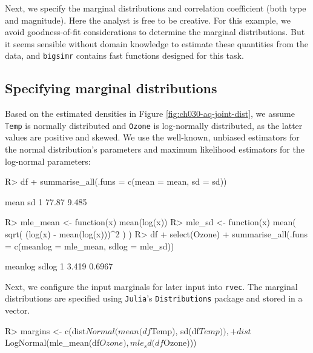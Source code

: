 \documentclass[
]{jss}
\begin{document}
Next, we specify the marginal distributions and correlation coefficient (both type and magnitude). Here the analyst is free to be creative. For this example, we avoid goodness-of-fit considerations to determine the marginal distributions. But it seems sensible without domain knowledge to estimate these quantities from the data, and \texttt{bigsimr} contains fast functions designed for this task.

\hypertarget{specifying-marginal-distributions}{%
\subsection{Specifying marginal distributions}\label{specifying-marginal-distributions}}

Based on the estimated densities in Figure \ref{fig:ch030-aq-joint-dist}, we assume \texttt{Temp} is normally distributed and \texttt{Ozone} is log-normally distributed, as the latter values are positive and skewed. We use the well-known, unbiased estimators for the normal distribution's parameters and maximum likelihood estimators for the log-normal parameters:

\begin{CodeChunk}
\begin{CodeInput}
R> df %
+   summarise_all(.funs = c(mean = mean, sd = sd))
\end{CodeInput}
\begin{CodeOutput}
   mean    sd
1 77.87 9.485
\end{CodeOutput}
\end{CodeChunk}

\begin{CodeChunk}
\begin{CodeInput}
R> mle_mean <- function(x) mean(log(x))
R> mle_sd <- function(x) mean( sqrt( (log(x) - mean(log(x)))^2 ) )
R> df %
+   select(Ozone) %
+   summarise_all(.funs = c(meanlog = mle_mean, sdlog = mle_sd))
\end{CodeInput}
\begin{CodeOutput}
  meanlog  sdlog
1   3.419 0.6967
\end{CodeOutput}
\end{CodeChunk}

Next, we configure the input marginals for later input into \texttt{rvec}. The marginal distributions are specified using \texttt{Julia}'s \texttt{Distributions} package and stored in a vector.

\begin{CodeChunk}
\begin{CodeInput}
R> margins <- c(dist$Normal(mean(df$Temp), sd(df$Temp)),
+              dist$LogNormal(mle_mean(df$Ozone), mle_sd(df$Ozone)))
\end{CodeInput}
\end{CodeChunk}
\end{document}
